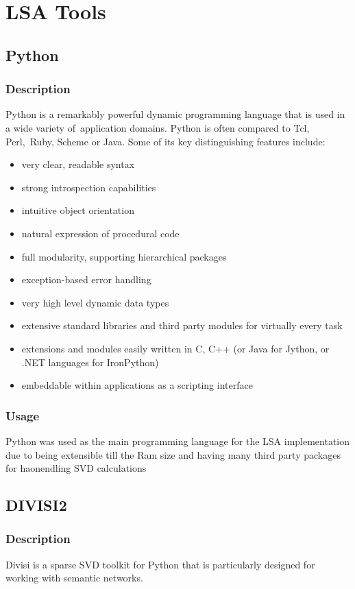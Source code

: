 \section{LSA Tools}
\subsection{Python}
\subsubsection{Description}
Python is a remarkably powerful dynamic programming language that is used in a wide variety of application domains. Python is often compared to Tcl, Perl, Ruby, Scheme or Java. Some of its key distinguishing features include:
\begin{itemize}
\item very clear, readable syntax
\item strong introspection capabilities
\item intuitive object orientation
\item natural expression of procedural code
\item full modularity, supporting hierarchical packages
\item exception-based error handling
\item very high level dynamic data types
\item extensive standard libraries and third party modules for virtually every task
\item extensions and modules easily written in C, C++ (or Java for Jython, or .NET languages for IronPython)
\item embeddable within applications as a scripting interface
\end{itemize}
\subsubsection{Usage}
Python was used as the main programming language for the LSA implementation due to being extensible till the Ram size and having many third party packages for haonendling SVD calculations
\subsection{DIVISI2}
\subsubsection{Description}
Divisi is a sparse SVD toolkit for Python that is particularly designed for working with semantic networks.
